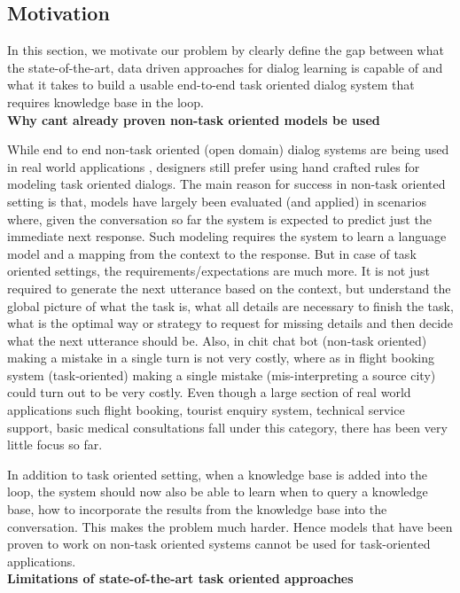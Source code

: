 \subsection{Motivation}
\label{subsec:motivation}
In this section, we motivate our problem by clearly define the gap between what the state-of-the-art, data driven approaches for dialog learning is capable of and what it takes to build a usable end-to-end task oriented dialog system that requires knowledge base in the loop.\\

\noindent
\textbf{Why cant already proven non-task oriented models be used}

While end to end non-task oriented (open domain) dialog systems are being used in real world applications \cite{smartreply}, designers still prefer using hand crafted rules for modeling task oriented dialogs. The main reason for success in non-task oriented setting is that, models have largely been evaluated (and applied) in scenarios where, given the conversation so far the system is expected to predict just the immediate next response. Such modeling requires the system to learn a language model and a mapping from the context to the response. But in case of task oriented settings, the requirements/expectations are much more. It is not just required to generate the next utterance based on the context, but understand the global picture of what the task is, what all details are necessary to finish the task, what is the optimal way or strategy to request for missing details and then decide what the next utterance should be. Also, in chit chat bot (non-task oriented) making a mistake in a single turn is not very costly, where as in flight booking system (task-oriented) making a single mistake (mis-interpreting a source city) could turn out to be very costly. Even though a large section of real world applications such flight booking, tourist enquiry system, technical service support, basic medical consultations fall under this category, there has been very little focus so far.

In addition to task oriented setting, when a knowledge base is added into the loop, the system should now also be able to learn when to query a knowledge base, how to incorporate the results from the knowledge base into the conversation. This makes the problem much harder. Hence models that have been proven to work on non-task oriented systems cannot be used for task-oriented applications.\\

\noindent
\textbf{Limitations of state-of-the-art task oriented approaches}

